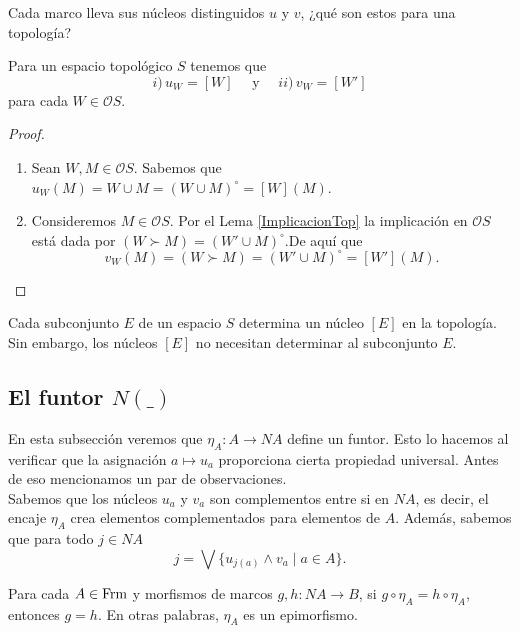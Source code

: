 Cada marco lleva sus núcleos distinguidos $u$ y $v$, ¿qué son estos para una topología?

\begin{lem}\label{UVTop}
     Para un espacio topológico $S$ tenemos que 
     \[
     i)\,u_W=[W]\quad\mbox{ y }\quad ii)\,v_W=[W']
     \]
     para cada $W\in \mathcal{O}S$.
\end{lem}

\begin{proof}
    \begin{enumerate}[$i)$]
        \item Sean $W, M\in \mathcal{O}S$. Sabemos que $u_W(M)=W\cup M=(W\cup M)^\circ=[W](M)$.
        \item Consideremos $M\in \mathcal{O}S$. Por el Lema \ref{ImplicacionTop} la implicación en $\mathcal{O}S$ está dada por $(W\succ M)=(W'\cup M)^\circ$.De aquí que 
        \[
        v_W(M)=(W\succ M)=(W'\cup M)^\circ=[W'](M).
        \]
    \end{enumerate}
\end{proof}

Cada subconjunto $E$ de un espacio $S$ determina un núcleo $[E]$ en la topología. Sin embargo, los núcleos $[E]$ no necesitan determinar al subconjunto $E$.\\

\subsection{El funtor $N( \_ )$}

En esta subsección veremos que $\eta_A\colon A\to NA$ define un funtor. Esto lo hacemos al verificar que la asignación $a\mapsto u_a$ proporciona cierta propiedad universal. Antes de eso mencionamos un par de observaciones.\\

Sabemos que los núcleos $u_a$ y $v_a$ son complementos entre si en $NA$, es decir, el encaje $\eta_A$ crea elementos complementados para elementos de $A$. Además, sabemos que para todo $j\in NA$
\[
j=\bigvee\{u_{j(a)}\wedge v_a\mid a\in A\}.
\]

\begin{lem}\label{Lema6.2.1}
    Para cada $A\in \mathrm{Frm}$ y morfismos de marcos $g, h\colon NA\to B$, si $g\circ \eta_A=h\circ \eta_A$, entonces $g=h$. En otras palabras, $\eta_A$ es un epimorfismo.
\end{lem}

